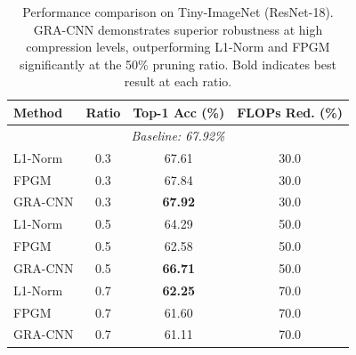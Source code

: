 \begin{table}[ht]
\centering
\caption{Performance comparison on Tiny-ImageNet (ResNet-18). GRA-CNN demonstrates superior robustness at high compression levels, outperforming L1-Norm and FPGM significantly at the 50\% pruning ratio. Bold indicates best result at each ratio.}
\label{tab:tiny_results}
\begin{tabular}{lccc}
\toprule
Method & Ratio & Top-1 Acc (\%) & FLOPs Red. (\%) \\
\midrule
\multicolumn{4}{c}{\textit{Baseline: 67.92\%}} \\
\midrule
L1-Norm & 0.3 & 67.61 & 30.0 \\
FPGM    & 0.3 & 67.84 & 30.0 \\
GRA-CNN & 0.3 & \textbf{67.92} & 30.0 \\
\midrule
L1-Norm & 0.5 & 64.29 & 50.0 \\
FPGM    & 0.5 & 62.58 & 50.0 \\
GRA-CNN & 0.5 & \textbf{66.71} & 50.0 \\
\midrule
L1-Norm & 0.7 & \textbf{62.25} & 70.0 \\
FPGM    & 0.7 & 61.60 & 70.0 \\
GRA-CNN & 0.7 & 61.11 & 70.0 \\
\bottomrule
\end{tabular}
\end{table}
